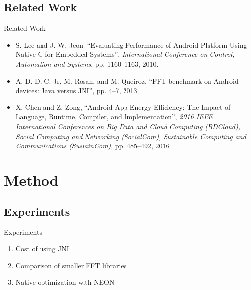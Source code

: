 \documentclass[xcolor={table}]{beamer}
\begin{document}
\subsection{Related Work}
\begin{frame}{Related Work}
    \begin{itemize}
        \item<1-> S. Lee and J. W. Jeon, \enquote{Evaluating Performance of Android Platform Using Native C for Embedded Systems}, \emph{International Conference on Control, Automation and Systems}, pp. 1160–1163, 2010.
        \item<2-> A. D. D. C. Jr, M. Rosan, and M. Queiroz, \enquote{FFT benchmark on Android devices: Java versus JNI}, pp. 4–7, 2013.
        \item<3-> X. Chen and Z. Zong, \enquote{Android App Energy Efficiency: The Impact of Language, Runtime, Compiler, and Implementation}, \emph{2016 IEEE International Conferences on Big Data and Cloud Computing (BDCloud), Social Computing and Networking (SocialCom), Sustainable Computing and Communications (SustainCom)}, pp. 485–492, 2016.
    \end{itemize}
\end{frame}

\section{Method}

\subsection{Experiments}
\begin{frame}{Experiments}
    \begin{enumerate}
        \item Cost of using JNI
        \item Comparison of smaller FFT libraries
        \item Native optimization with NEON
    \end{enumerate}
\end{frame}
\end{document}
